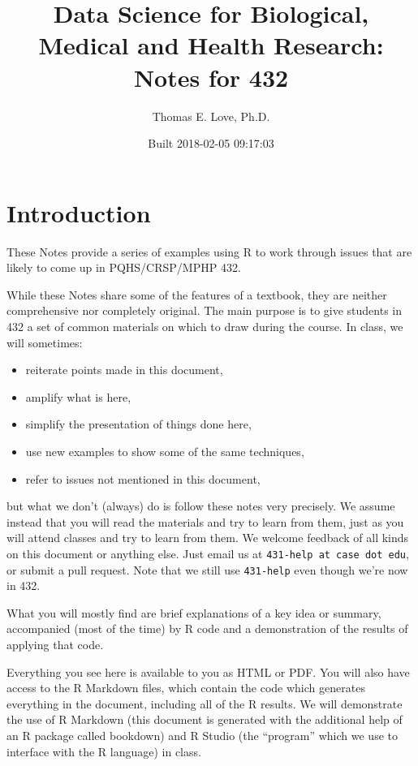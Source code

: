 \documentclass[]{book}
\title{Data Science for Biological, Medical and Health Research: Notes for 432}
\author{Thomas E. Love, Ph.D.}
\date{Built 2018-02-05 09:17:03}
\providecommand{\tightlist}{%
  \setlength{\itemsep}{0pt}\setlength{\parskip}{0pt}}
\theoremstyle{definition}
\theoremstyle{definition}
\theoremstyle{definition}
\theoremstyle{remark}
\begin{document}
\maketitle

{
\setcounter{tocdepth}{1}
\tableofcontents
}
\chapter*{Introduction}\label{introduction}

These Notes provide a series of examples using R to work through issues
that are likely to come up in PQHS/CRSP/MPHP 432.

While these Notes share some of the features of a textbook, they are
neither comprehensive nor completely original. The main purpose is to
give students in 432 a set of common materials on which to draw during
the course. In class, we will sometimes:

\begin{itemize}
\tightlist
\item
  reiterate points made in this document,
\item
  amplify what is here,
\item
  simplify the presentation of things done here,
\item
  use new examples to show some of the same techniques,
\item
  refer to issues not mentioned in this document,
\end{itemize}

but what we don't (always) do is follow these notes very precisely. We
assume instead that you will read the materials and try to learn from
them, just as you will attend classes and try to learn from them. We
welcome feedback of all kinds on this document or anything else. Just
email us at \texttt{431-help\ at\ case\ dot\ edu}, or submit a pull
request. Note that we still use \texttt{431-help} even though we're now
in 432.

What you will mostly find are brief explanations of a key idea or
summary, accompanied (most of the time) by R code and a demonstration of
the results of applying that code.

Everything you see here is available to you as HTML or PDF. You will
also have access to the R Markdown files, which contain the code which
generates everything in the document, including all of the R results. We
will demonstrate the use of R Markdown (this document is generated with
the additional help of an R package called bookdown) and R Studio (the
``program'' which we use to interface with the R language) in class.
\end{document}
